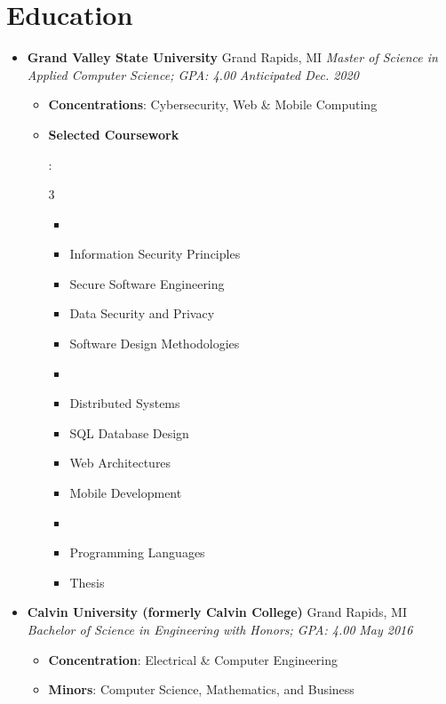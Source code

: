 \documentclass[letterpaper,11pt]{article}
\newcommand{\resumeItem}[2]{
  \item\small{
    \textbf{#1}{: #2 \vspace{-2pt}}
  }
}
\newcommand{\resumeSubheading}[4]{
  \vspace{-1pt}\item
    \textbf{#1} \dotfill #2 \newline
    \textit{\small#3} \hfill \textit{\small #4}
  \vspace{-5pt}
}
\newcommand{\resumeSubHeadingListStart}{\begin{itemize}[leftmargin=*]}
\newcommand{\resumeSubHeadingListEnd}{\end{itemize}}
\newcommand{\resumeItemListStart}{\begin{itemize}}
\newcommand{\resumeItemListEnd}{\end{itemize}\vspace{-5pt}}
\newcommand{\resumeListMulticolStart}[1]{
  \vspace{-2.4em}
  \setlength{\columnsep}{-1pc}
  \begin{multicols}{#1}
    \begin{itemize}[label={}]
      \item
}
\newcommand{\resumeListMulticolEnd}{
    \end{itemize}
  \end{multicols}
  \vspace{-10pt}
}
\begin{document}
\section{Education}
  \resumeSubHeadingListStart
    \resumeSubheading
      {Grand Valley State University}{Grand Rapids, MI}
      {Master of Science in Applied Computer Science; GPA: 4.00}{Anticipated Dec. 2020}
      \resumeItemListStart
        \resumeItem{Concentrations}
          {Cybersecurity, Web \& Mobile Computing}
        \resumeItem{Selected Coursework}
          {
            \resumeListMulticolStart{3}
              \item Information Security Principles
              \item Secure Software Engineering
              \item Data Security and Privacy
              \item Software Design Methodologies
              \item %
              \item Distributed Systems
              \item SQL Database Design
              \item Web Architectures
              \item Mobile Development
              \item %
              \item Programming Languages
              \item Thesis
            \resumeListMulticolEnd
          }
      \resumeItemListEnd
    \resumeSubheading
      {Calvin University (formerly Calvin College)}{Grand Rapids, MI}
      {Bachelor of Science in Engineering with Honors; GPA: 4.00}{May 2016}
      \resumeItemListStart
        \resumeItem{Concentration}
          {Electrical \& Computer Engineering}
        \resumeItem{Minors}
          {Computer Science, Mathematics, and Business}
      \resumeItemListEnd
  \resumeSubHeadingListEnd
\end{document}
